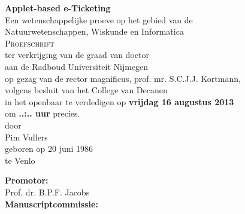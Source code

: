 \thispagestyle{empty}

\begin{center}
  \textbf{\Large Applet-based e-Ticketing}\\[15mm]

  Een wetenschappelijke proeve op het gebied van de \\
  Natuurwetenschappen, Wiskunde en Informatica \\[15mm]

  \textsc{Proefschrift} \\[15mm]

  ter verkrijging van de graad van doctor \\
  aan de Radboud Universiteit Nijmegen \\
  op gezag van de rector magnificus, prof. mr. S.C.J.J. Kortmann, \\
  volgens besluit van het College van Decanen \\
  in het openbaar te verdedigen op \textbf{vrijdag 16 augustus 2013} \\
  om \textbf{..:.. uur} precies. \\[30mm]

  door \\[30mm]

  Pim Vullers \\[15mm]

  geboren op 20 juni 1986 \\
  te Venlo
\end{center}

\clearpage

\begin{flushleft}
  \thispagestyle{empty}

  \textbf{Promotor:} \\
  \indent Prof. dr. B.P.F. Jacobs \\[15mm]

  \textbf{Manuscriptcommissie:}
\end{flushleft}